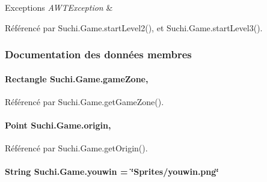 \begin{DoxyExceptions}{Exceptions}
{\em A\+W\+T\+Exception} & \\
\hline
\end{DoxyExceptions}


Référencé par Suchi.\+Game.\+start\+Level2(), et Suchi.\+Game.\+start\+Level3().



\subsubsection{Documentation des données membres}
\hypertarget{classSuchi_1_1Game_a6beaeaaa0a1075d9420693dda0620d12}{}
\paragraph[{game\+Zone}]{\setlength{\rightskip}{0pt plus 5cm}Rectangle Suchi.\+Game.\+game\+Zone\hspace{0.3cm}{\ttfamily [static]}, {\ttfamily [private]}}\label{classSuchi_1_1Game_a6beaeaaa0a1075d9420693dda0620d12}


Référencé par Suchi.\+Game.\+get\+Game\+Zone().

\hypertarget{classSuchi_1_1Game_a9b3921f82615ebbd22a71a3334ba48db}{}
\paragraph[{origin}]{\setlength{\rightskip}{0pt plus 5cm}Point Suchi.\+Game.\+origin\hspace{0.3cm}{\ttfamily [static]}, {\ttfamily [private]}}\label{classSuchi_1_1Game_a9b3921f82615ebbd22a71a3334ba48db}


Référencé par Suchi.\+Game.\+get\+Origin().

\hypertarget{classSuchi_1_1Game_ac376917f0f8c62cd49134c459c61fd2c}{}
\paragraph[{youwin}]{\setlength{\rightskip}{0pt plus 5cm}String Suchi.\+Game.\+youwin = \char`\"{}Sprites/youwin.\+png\char`\"{}\hspace{0.3cm}{\ttfamily [private]}}\label{classSuchi_1_1Game_ac376917f0f8c62cd49134c459c61fd2c}
\hypertarget{classSuchi_1_1Game_ae96d9d4f7dfa76d515cd059fa78884e8}{}
